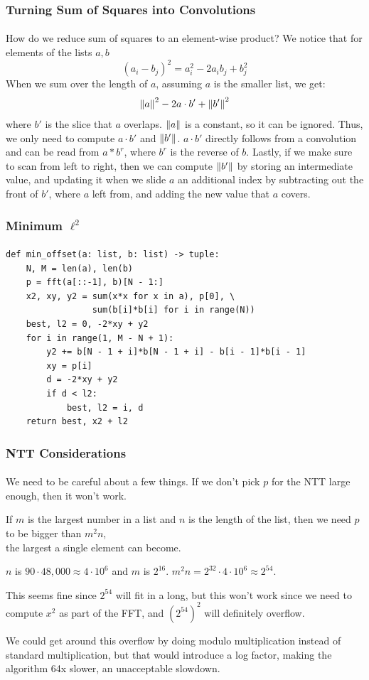 \documentclass[11pt,handout]{beamer}             %
\begin{document}
\begin{frame}
\frametitle{Turning Sum of Squares into Convolutions}
\framesubtitle{}
How do we reduce sum of squares to an element-wise product?
\pause
We notice that for elements of the lists \( a, b \)
\[ (a_i - b_j)^2 = a_i^2 - 2a_i b_j + b_j^2 \]
\pause 
When we sum over the length of \( a \),
assuming \( a \) is the smaller list, we get:
\[ \norm{a}^2 - 2 a \cdot b' + \norm{b'}^2 \] 
where \( b' \) is the slice that \( a \) overlaps.
\pause
\( \norm{a} \) is a constant, so it can be ignored.
Thus, we only need to compute \( a \cdot b' \) and \( \norm{b'} \).
\pause
\( a \cdot b' \) directly follows from a convolution and
can be read from \( a * b^r \), where \( b^r \) is the reverse of \( b \).
\pause
Lastly, if we make sure to scan from left to right, then we can compute
\( \norm{b'} \) by storing an intermediate value, and updating it when we slide 
\( a \) an additional index by subtracting out the front of \( b' \), where
\( a \) left from, and adding the new value that \( a \) covers.
\end{frame}

\begin{frame}[fragile]
\frametitle{Minimum \( \ell^2 \)}
\framesubtitle{}
\begin{verbatim}
def min_offset(a: list, b: list) -> tuple:
    N, M = len(a), len(b)
    p = fft(a[::-1], b)[N - 1:]
    x2, xy, y2 = sum(x*x for x in a), p[0], \
                 sum(b[i]*b[i] for i in range(N))
    best, l2 = 0, -2*xy + y2
    for i in range(1, M - N + 1):
        y2 += b[N - 1 + i]*b[N - 1 + i] - b[i - 1]*b[i - 1]
        xy = p[i]
        d = -2*xy + y2
        if d < l2:
            best, l2 = i, d
    return best, x2 + l2
\end{verbatim}
\end{frame}

\begin{frame}
\frametitle{NTT Considerations}
\framesubtitle{}
We need to be careful about a few things. If we don't pick \( p \) for the NTT
large enough, then it won't work. \pause

If \( m \) is the largest number in a list
and \( n \) is the length of the list, then we need \( p \) to be bigger than
\( m^2 n \), \\ the largest a single element can become. \pause

\( n \) is \( 90 \cdot 48,000 \approx 4 \cdot 10^6 \) and \( m \) is
\( 2^{16} \). \( m^2 n = 2^{32} \cdot 4 \cdot 10^6 \approx 2^{54} \). \pause

This seems fine since \( 2^{54} \) will fit in a long, but this won't work
since we need to compute \( x^2 \) as part of the FFT, and \( (2^{54})^2 \)
will definitely overflow. \pause

We could get around this overflow by doing modulo
multiplication instead of standard multiplication, but that would introduce
a log factor, making the algorithm 64x slower, an unacceptable slowdown.
\end{frame}
\end{document}
